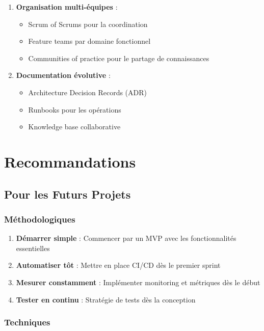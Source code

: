 \begin{enumerate}
    \item \textbf{Organisation multi-équipes} :
    \begin{itemize}
        \item Scrum of Scrums pour la coordination
        \item Feature teams par domaine fonctionnel
        \item Communities of practice pour le partage de connaissances
    \end{itemize}
    
    \item \textbf{Documentation évolutive} :
    \begin{itemize}
        \item Architecture Decision Records (ADR)
        \item Runbooks pour les opérations
        \item Knowledge base collaborative
    \end{itemize}
\end{enumerate}

\section{Recommandations}

\subsection{Pour les Futurs Projets}

\subsubsection{Méthodologiques}

\begin{enumerate}
    \item \textbf{Démarrer simple} : Commencer par un MVP avec les fonctionnalités essentielles
    \item \textbf{Automatiser tôt} : Mettre en place CI/CD dès le premier sprint
    \item \textbf{Mesurer constamment} : Implémenter monitoring et métriques dès le début
    \item \textbf{Tester en continu} : Stratégie de tests dès la conception
\end{enumerate}

\subsubsection{Techniques}


